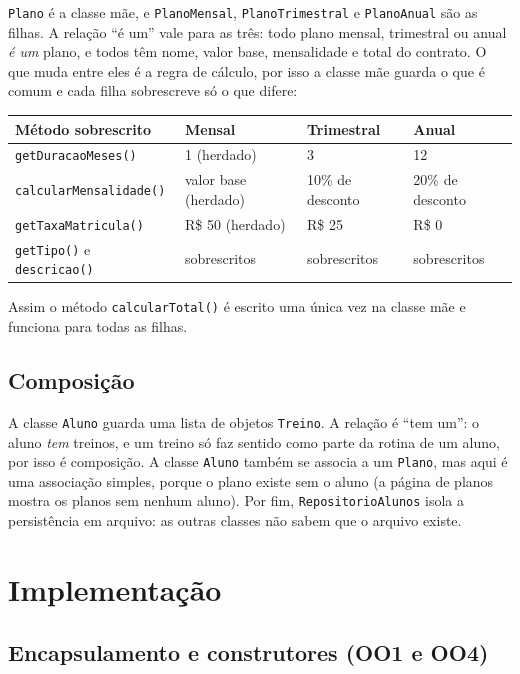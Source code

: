 \documentclass[12pt,a4paper]{article}
\begin{document}
\texttt{Plano} é a classe mãe, e \texttt{PlanoMensal}, \texttt{PlanoTrimestral} e \texttt{PlanoAnual} são as filhas. A relação ``é um'' vale para as três: todo plano mensal, trimestral ou anual \emph{é um} plano, e todos têm nome, valor base, mensalidade e total do contrato. O que muda entre eles é a regra de cálculo, por isso a classe mãe guarda o que é comum e cada filha sobrescreve só o que difere:

\begin{center}
\begin{tabularx}{\linewidth}{@{}lXXX@{}}
  \toprule
  \textbf{Método sobrescrito} & \textbf{Mensal} & \textbf{Trimestral} & \textbf{Anual} \\
  \midrule
  \texttt{getDuracaoMeses()} & 1 (herdado) & 3 & 12 \\
  \texttt{calcularMensalidade()} & valor base (herdado) & 10\% de desconto & 20\% de desconto \\
  \texttt{getTaxaMatricula()} & R\$ 50 (herdado) & R\$ 25 & R\$ 0 \\
  \texttt{getTipo()} e \texttt{descricao()} & sobrescritos & sobrescritos & sobrescritos \\
  \bottomrule
\end{tabularx}
\end{center}

Assim o método \texttt{calcularTotal()} é escrito uma única vez na classe mãe e funciona para todas as filhas.

\subsection{Composição}

A classe \texttt{Aluno} guarda uma lista de objetos \texttt{Treino}. A relação é ``tem um'': o aluno \emph{tem} treinos, e um treino só faz sentido como parte da rotina de um aluno, por isso é composição. A classe \texttt{Aluno} também se associa a um \texttt{Plano}, mas aqui é uma associação simples, porque o plano existe sem o aluno (a página de planos mostra os planos sem nenhum aluno). Por fim, \texttt{RepositorioAlunos} isola a persistência em arquivo: as outras classes não sabem que o arquivo existe.

\section{Implementação}

\subsection{Encapsulamento e construtores (OO1 e OO4)}
\end{document}
